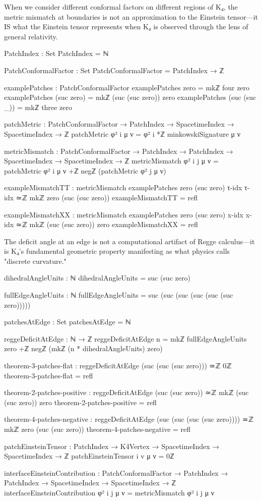 \documentclass[11pt,a4paper]{book}
\begin{document}
When we consider different conformal factors on different regions of K₄, the metric mismatch at boundaries is not an approximation to the Einstein tensor—it IS what the Einstein tensor represents when K₄ is observed through the lens of general relativity.

\begin{code}
PatchIndex : Set
PatchIndex = ℕ

PatchConformalFactor : Set
PatchConformalFactor = PatchIndex → ℤ

examplePatches : PatchConformalFactor
examplePatches zero = mkℤ four zero
examplePatches (suc zero) = mkℤ (suc (suc zero)) zero
examplePatches (suc (suc _)) = mkℤ three zero

patchMetric : PatchConformalFactor → PatchIndex → 
              SpacetimeIndex → SpacetimeIndex → ℤ
patchMetric φ² i μ ν = φ² i *ℤ minkowskiSignature μ ν

metricMismatch : PatchConformalFactor → PatchIndex → PatchIndex → 
                 SpacetimeIndex → SpacetimeIndex → ℤ
metricMismatch φ² i j μ ν = 
  patchMetric φ² i μ ν +ℤ negℤ (patchMetric φ² j μ ν)

exampleMismatchTT : metricMismatch examplePatches zero (suc zero) τ-idx τ-idx 
                    ≃ℤ mkℤ zero (suc (suc zero))
exampleMismatchTT = refl

exampleMismatchXX : metricMismatch examplePatches zero (suc zero) x-idx x-idx 
                    ≃ℤ mkℤ (suc (suc zero)) zero
exampleMismatchXX = refl
\end{code}

The deficit angle at an edge is not a computational artifact of Regge calculus—it is K₄'s fundamental geometric property manifesting as what physics calls "discrete curvature."

\begin{code}
dihedralAngleUnits : ℕ
dihedralAngleUnits = suc (suc zero)

fullEdgeAngleUnits : ℕ
fullEdgeAngleUnits = suc (suc (suc (suc (suc (suc zero)))))

patchesAtEdge : Set
patchesAtEdge = ℕ

reggeDeficitAtEdge : ℕ → ℤ
reggeDeficitAtEdge n = 
  mkℤ fullEdgeAngleUnits zero +ℤ 
  negℤ (mkℤ (n * dihedralAngleUnits) zero)

theorem-3-patches-flat : reggeDeficitAtEdge (suc (suc (suc zero))) ≃ℤ 0ℤ
theorem-3-patches-flat = refl

theorem-2-patches-positive : reggeDeficitAtEdge (suc (suc zero)) ≃ℤ mkℤ (suc (suc zero)) zero
theorem-2-patches-positive = refl

theorem-4-patches-negative : reggeDeficitAtEdge (suc (suc (suc (suc zero)))) ≃ℤ mkℤ zero (suc (suc zero))
theorem-4-patches-negative = refl

patchEinsteinTensor : PatchIndex → K4Vertex → SpacetimeIndex → SpacetimeIndex → ℤ
patchEinsteinTensor i v μ ν = 0ℤ

interfaceEinsteinContribution : PatchConformalFactor → PatchIndex → PatchIndex → 
                                 SpacetimeIndex → SpacetimeIndex → ℤ
interfaceEinsteinContribution φ² i j μ ν = 
  metricMismatch φ² i j μ ν
\end{code}
\end{document}
